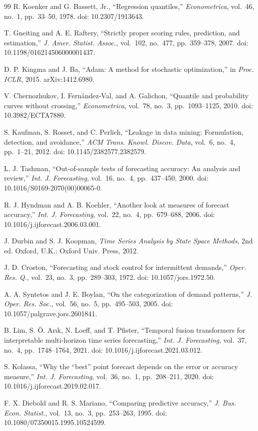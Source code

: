 \documentclass[conference]{IEEEtran}
\begin{document}
\begin{thebibliography}{99}
 R. Koenker and G. Bassett, Jr., ``Regression quantiles,'' \emph{Econometrica},
  vol.~46, no.~1, pp.~33--50, 1978. doi: 10.2307/1913643.

 T. Gneiting and A. E. Raftery, ``Strictly proper scoring rules, prediction,
  and estimation,'' \emph{J. Amer. Statist. Assoc.}, vol.~102, no.~477, pp.~359--378, 2007. doi:
  10.1198/016214506000001437.

 D. P. Kingma and J. Ba, ``Adam: A method for stochastic optimization,'' in
  \emph{Proc. ICLR}, 2015. arXiv:1412.6980.

 V. Chernozhukov, I. Fern\'andez-Val, and A. Galichon, ``Quantile and
  probability curves without crossing,'' \emph{Econometrica}, vol.~78, no.~3, pp.~1093--1125, 2010.
  doi: 10.3982/ECTA7880.

 S. Kaufman, S. Rosset, and C. Perlich, ``Leakage in data mining: Formulation,
  detection, and avoidance,'' \emph{ACM Trans. Knowl. Discov. Data}, vol.~6, no.~4, pp.~1--21, 2012.
  doi: 10.1145/2382577.2382579.

 L. J. Tashman, ``Out-of-sample tests of forecasting accuracy: An analysis and
  review,'' \emph{Int. J. Forecasting}, vol.~16, no.~4, pp.~437--450, 2000. doi:
  10.1016/S0169-2070(00)00065-0.

 R. J. Hyndman and A. B. Koehler, ``Another look at measures of forecast
  accuracy,'' \emph{Int. J. Forecasting}, vol.~22, no.~4, pp.~679--688, 2006. doi:
  10.1016/j.ijforecast.2006.03.001.

 J. Durbin and S. J. Koopman, \emph{Time Series Analysis by State Space
  Methods}, 2nd ed. Oxford, U.K.: Oxford Univ. Press, 2012.

 J. D. Croston, ``Forecasting and stock control for intermittent demands,''
  \emph{Oper. Res. Q.}, vol.~23, no.~3, pp.~289--303, 1972. doi: 10.1057/jors.1972.50.

 A. A. Syntetos and J. E. Boylan, ``On the categorization of demand
  patterns,'' \emph{J. Oper. Res. Soc.}, vol.~56, no.~5, pp.~495--503, 2005. doi:
  10.1057/palgrave.jors.2601841.

 B. Lim, S. {\"O}. Ar\i k, N. Loeff, and T. Pfister, ``Temporal fusion transformers
  for interpretable multi-horizon time series forecasting,'' \emph{Int. J. Forecasting}, vol.~37,
  no.~4, pp.~1748--1764, 2021. doi: 10.1016/j.ijforecast.2021.03.012.

 S. Kolassa, ``Why the ``best'' point forecast depends on the error or
  accuracy measure,'' \emph{Int. J. Forecasting}, vol.~36, no.~1, pp.~208--211, 2020. doi:
  10.1016/j.ijforecast.2019.02.017.

 F. X. Diebold and R. S. Mariano, ``Comparing predictive accuracy,'' \emph{J.
  Bus. Econ. Statist.}, vol.~13, no.~3, pp.~253--263, 1995. doi: 10.1080/07350015.1995.10524599.

\end{thebibliography}
\end{document}
